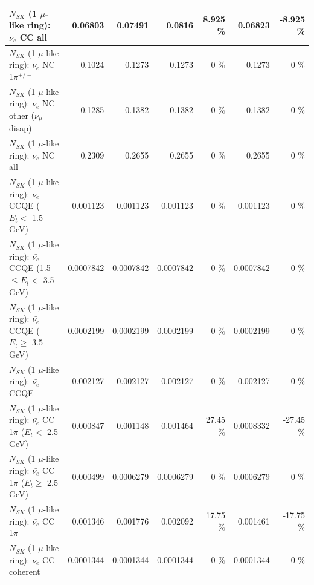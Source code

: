 \begin{table}
\begin{tabular}{| l | r | r | r  r | r  r |}
                                  $N_{SK}$ (1 $\mu$-like ring): $\nu_{e}$ CC all &         0.06803 &         0.07491 &          0.0816 &    8.925 \%  &         0.06823 &   -8.925 \%  \\ 
\hline
                           $N_{SK}$ (1 $\mu$-like ring): $\nu_e$ NC 1$\pi^{+/-}$ &          0.1024 &          0.1273 &          0.1273 &        0 \%  &          0.1273 &        0 \%  \\ 
                $N_{SK}$ (1 $\mu$-like ring): $\nu_e$ NC other ($\nu_\mu$ disap) &          0.1285 &          0.1382 &          0.1382 &        0 \%  &          0.1382 &        0 \%  \\ 
                                  $N_{SK}$ (1 $\mu$-like ring): $\nu_{e}$ NC all &          0.2309 &          0.2655 &          0.2655 &        0 \%  &          0.2655 &        0 \%  \\ 
\hline
\hline
\hline
            $N_{SK}$ (1 $\mu$-like ring): $\bar{\nu_e}$ CCQE ($E_{t} <$ 1.5 GeV) &        0.001123 &        0.001123 &        0.001123 &        0 \%  &        0.001123 &        0 \%  \\ 
   $N_{SK}$ (1 $\mu$-like ring): $\bar{\nu_e}$ CCQE (1.5 $\leq E_{t} <$ 3.5 GeV) &       0.0007842 &       0.0007842 &       0.0007842 &        0 \%  &       0.0007842 &        0 \%  \\ 
         $N_{SK}$ (1 $\mu$-like ring): $\bar{\nu_e}$ CCQE ($E_{t} \geq$ 3.5 GeV) &       0.0002199 &       0.0002199 &       0.0002199 &        0 \%  &       0.0002199 &        0 \%  \\ 
\hline
                                $N_{SK}$ (1 $\mu$-like ring): $\bar{\nu_e}$ CCQE &        0.002127 &        0.002127 &        0.002127 &        0 \%  &        0.002127 &        0 \%  \\ 
\hline
       $N_{SK}$ (1 $\mu$-like ring): $\bar{\nu_e}$ CC 1$\pi$ ($E_{t} <$ 2.5 GeV) &        0.000847 &        0.001148 &        0.001464 &    27.45 \%  &       0.0008332 &   -27.45 \%  \\ 
    $N_{SK}$ (1 $\mu$-like ring): $\bar{\nu_e}$ CC 1$\pi$ ($E_{t} \geq$ 2.5 GeV) &        0.000499 &       0.0006279 &       0.0006279 &        0 \%  &       0.0006279 &        0 \%  \\ 
\hline
                           $N_{SK}$ (1 $\mu$-like ring): $\bar{\nu_e}$ CC 1$\pi$ &        0.001346 &        0.001776 &        0.002092 &    17.75 \%  &        0.001461 &   -17.75 \%  \\ 
                         $N_{SK}$ (1 $\mu$-like ring): $\bar{\nu_e}$ CC coherent &       0.0001344 &       0.0001344 &       0.0001344 &        0 \%  &       0.0001344 &        0 \%  \\ 

\end{tabular}
\end{table}
